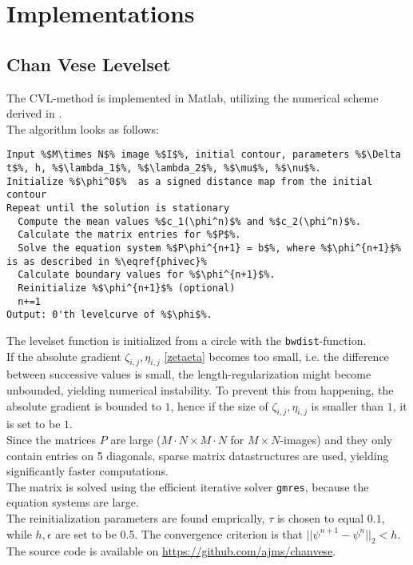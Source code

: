 \chapter{Implementations}\label{AppendixB} %

\section{Chan Vese Levelset}
The CVL-method is implemented in Matlab, utilizing the numerical scheme derived in .\\
The algorithm looks as follows:\\

\begin{lstlisting}
Input %$M\times N$% image %$I$%, initial contour, parameters %$\Delta t$%, h, %$\lambda_1$%, %$\lambda_2$%, %$\mu$%, %$\nu$%.
Initialize %$\phi^0$%  as a signed distance map from the initial contour
Repeat until the solution is stationary
  Compute the mean values %$c_1(\phi^n)$% and %$c_2(\phi^n)$%.
  Calculate the matrix entries for %$P$%.
  Solve the equation system %$P\phi^{n+1} = b$%, where %$\phi^{n+1}$% is as described in %\eqref{phivec}%
  Calculate boundary values for %$\phi^{n+1}$%.
  Reinitialize %$\phi^{n+1}$% (optional)
  n+=1
Output: 0'th levelcurve of %$\phi$%.
\end{lstlisting}

The levelset function is initialized from a circle with the \texttt{bwdist}-function.\\
If the absolute gradient $\zeta_{i,j}, \eta_{i,j}$ \eqref{zetaeta} becomes too small, i.e. the difference between successive values is small, the length-regularization might become unbounded, yielding numerical instability. To prevent this from happening, the absolute gradient is bounded to $1$, hence if the size of $\zeta_{i,j}, \eta_{i,j}$ is smaller than $1$, it is set to be $1$.\\
Since the matrices $P$ are large ($M\cdot N\times M\cdot N$ for $M\times N$-images) and they only contain entries on 5 diagonals, sparse matrix datastructures are used, yielding significantly faster computations.\\
The matrix is solved using the efficient iterative solver \texttt{gmres}, because the equation systems are large.\\
The reinitialization parameters are found emprically, $\tau$ is chosen to equal $0.1$, while $h,\epsilon$ are set to be 0.5. The convergence criterion is that $||\psi^{n+1}-\psi^n||_2 < h$. \\
The source code is available on \href{https://github.com/ajms/chanvese}{https://github.com/ajms/chanvese}.

